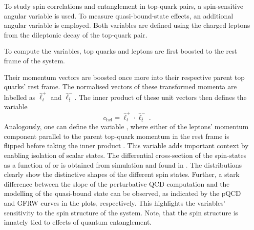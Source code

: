 To study spin correlations and entanglement in top-quark pairs, a spin-sensitive angular variable is used. To measure quasi-bound-state effects, an additional angular variable is employed. Both variables are defined using the charged leptons from the dileptonic decay of the top-quark pair.

To compute the variables, top quarks and leptons are first boosted to the rest frame of the \ttbar system.

Their momentum vectors are boosted once more into their respective parent top quarks' rest frame. The normalised vectors of these transformed momenta are labelled as $\hat \ell_{t}^+$ and $\hat \ell^-_{\bar{t}}$. The inner product of these unit vectors then defines the variable \begin{equation}
  \label{eq:c_hel}
  c_{\text{hel}} = \hat \ell_{t}^+ \cdot \hat \ell_{\bar{t}}^-~.
\end{equation}
Analogously, one can define the variable \chan, where either of the leptons' momentum component parallel to the parent top-quark momentum in the \ttbar rest frame is flipped before taking the inner product \cite{bernreuther_nlospin_2004,bernreuther_spin_observables}. This variable adds important context by enabling isolation of scalar states. The differential cross-section of the spin-states as a function of \chel or \chan is obtained from simulation and found in . The distributions clearly show the distinctive shapes of the different spin states. Further, a stark difference between the slope of the perturbative QCD computation and the modelling of the quasi-bound state can be observed, as indicated by the pQCD \ttbar and GFRW \ttbar curves in the plots, respectively.
This highlights the variables' sensitivity to the spin structure of the \ttbar system. Note, that the spin structure is innately tied to effects of quantum entanglement.
